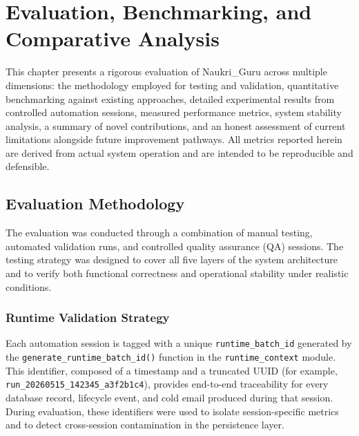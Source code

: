 \documentclass[12pt, a4paper, oneside]{report}
\begin{document}
\chapter{Evaluation, Benchmarking, and Comparative Analysis}
\label{chap:evaluation}

This chapter presents a rigorous evaluation of Naukri\_Guru across multiple dimensions: the methodology employed for testing and validation, quantitative benchmarking against existing approaches, detailed experimental results from controlled automation sessions, measured performance metrics, system stability analysis, a summary of novel contributions, and an honest assessment of current limitations alongside future improvement pathways. All metrics reported herein are derived from actual system operation and are intended to be reproducible and defensible.

\section{Evaluation Methodology}
\label{sec:eval-methodology}

The evaluation was conducted through a combination of manual testing, automated validation runs, and controlled quality assurance (QA) sessions. The testing strategy was designed to cover all five layers of the system architecture and to verify both functional correctness and operational stability under realistic conditions.

\subsection{Runtime Validation Strategy}

Each automation session is tagged with a unique \texttt{runtime\_batch\_id} generated by the \texttt{generate\_runtime\_batch\_id()} function in the \texttt{runtime\_context} module. This identifier, composed of a timestamp and a truncated UUID (for example, \texttt{run\_20260515\_142345\_a3f2b1c4}), provides end-to-end traceability for every database record, lifecycle event, and cold email produced during that session. During evaluation, these identifiers were used to isolate session-specific metrics and to detect cross-session contamination in the persistence layer.
\end{document}
